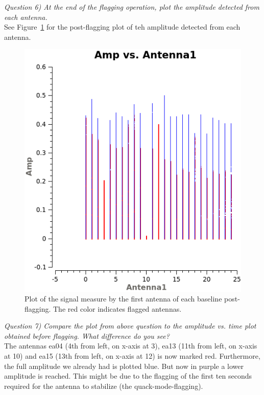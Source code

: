 \documentclass[12pt, a4paper]{article}
\begin{document}
\noindent \textit{Question 6) At the end of the flagging operation, plot the amplitude detected from each antenna.}  \\
See Figure~\ref{fig:part2-q6} for the post-flagging plot of teh amplitude detected from each antenna.
\begin{figure}
    \centering
    \includegraphics[scale=0.65]{../Imaging/plots2/amp_vs_antenna1_part2_vraag6_with_display-FlaggedPointsSymbol-custom.png}
    \caption{Plot of the signal measure by the first antenna of each baseline post-flagging. The red color indicates flagged antennas. \label{fig:part2-q6}}
\end{figure}

\noindent \textit{Question 7) Compare the plot from above question to the amplitude vs. time plot obtained before flagging. What difference do you see?} \\
The antennas ea04 (4th from left, on x-axis at 3), ea13 (11th from left, on x-axis at 10) and ea15 (13th from left, on x-axis at 12) is now marked red. Furthermore, the full amplitude we already had is plotted blue. But now in purple a lower amplitude is reached. This might be due to the flagging of the first ten seconds required for the antenna to stabilize (the quack-mode-flagging). \\
\end{document}
